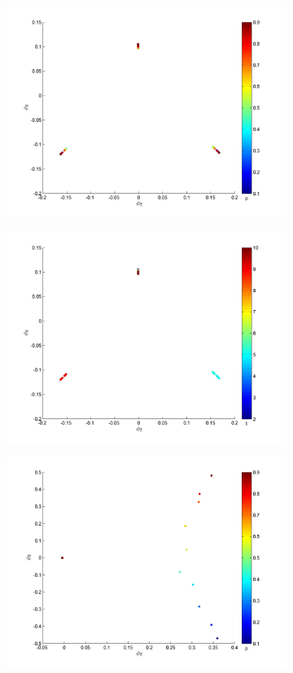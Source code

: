 \documentclass[prl,reprint]{revtex4-1}
\begin{document}
\begin{figure}[htb]
\begin{subfigure}{0.2\textwidth}
\includegraphics[width=\textwidth]{rawhist_p_1}
\caption{}
\end{subfigure}
\begin{subfigure}{0.2\textwidth}
\includegraphics[width=\textwidth]{rawhist_t_1}
\caption{}
\end{subfigure}
\begin{subfigure}{0.2\textwidth}
\includegraphics[width=\textwidth]{rawhist_p_400}

\end{subfigure}
\end{figure}
\end{document}
